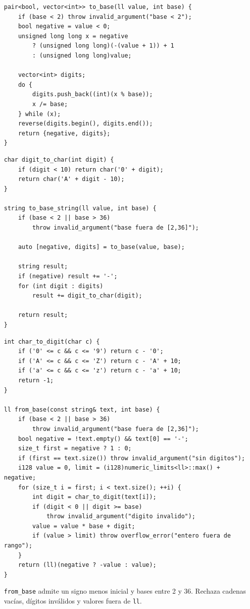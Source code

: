 \begin{lstlisting}[style=cpp]
pair<bool, vector<int>> to_base(ll value, int base) {
    if (base < 2) throw invalid_argument("base < 2");
    bool negative = value < 0;
    unsigned long long x = negative
        ? (unsigned long long)(-(value + 1)) + 1
        : (unsigned long long)value;

    vector<int> digits;
    do {
        digits.push_back((int)(x % base));
        x /= base;
    } while (x);
    reverse(digits.begin(), digits.end());
    return {negative, digits};
}
\end{lstlisting}
\begin{lstlisting}[style=cpp]
char digit_to_char(int digit) {
    if (digit < 10) return char('0' + digit);
    return char('A' + digit - 10);
}

string to_base_string(ll value, int base) {
    if (base < 2 || base > 36)
        throw invalid_argument("base fuera de [2,36]");

    auto [negative, digits] = to_base(value, base);

    string result;
    if (negative) result += '-';
    for (int digit : digits)
        result += digit_to_char(digit);

    return result;
}
\end{lstlisting}
\begin{lstlisting}[style=cpp]
int char_to_digit(char c) {
    if ('0' <= c && c <= '9') return c - '0';
    if ('A' <= c && c <= 'Z') return c - 'A' + 10;
    if ('a' <= c && c <= 'z') return c - 'a' + 10;
    return -1;
}

ll from_base(const string& text, int base) {
    if (base < 2 || base > 36)
        throw invalid_argument("base fuera de [2,36]");
    bool negative = !text.empty() && text[0] == '-';
    size_t first = negative ? 1 : 0;
    if (first == text.size()) throw invalid_argument("sin digitos");
    i128 value = 0, limit = (i128)numeric_limits<ll>::max() + negative;
    for (size_t i = first; i < text.size(); ++i) {
        int digit = char_to_digit(text[i]);
        if (digit < 0 || digit >= base)
            throw invalid_argument("digito invalido");
        value = value * base + digit;
        if (value > limit) throw overflow_error("entero fuera de rango");
    }
    return (ll)(negative ? -value : value);
}
\end{lstlisting}

\texttt{from\_base} admite un signo menos inicial y bases entre 2 y 36.
Rechaza cadenas vac\'ias, d\'igitos inv\'alidos y valores fuera de \texttt{ll}.
